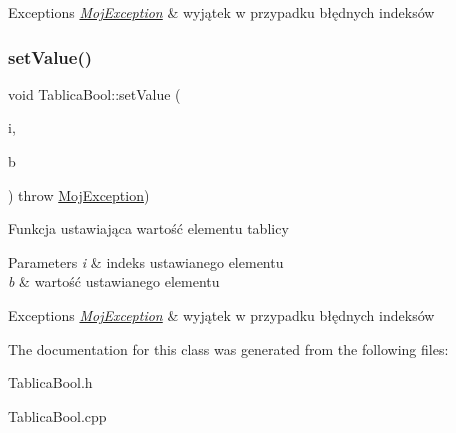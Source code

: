 \begin{DoxyExceptions}{Exceptions}
{\em \mbox{\hyperlink{class_moj_exception}{Moj\+Exception}}} & wyjątek w przypadku błędnych indeksów \\
\hline
\end{DoxyExceptions}
\mbox{\label{class_tablica_bool_a10ca9f3b3a983162934b4f3e277c7a74}} 
\subsubsection{\texorpdfstring{set\+Value()}{setValue()}}
{\footnotesize\ttfamily void Tablica\+Bool\+::set\+Value (\begin{DoxyParamCaption}\item[{long}]{i,  }\item[{bool}]{b }\end{DoxyParamCaption}) throw  \mbox{\hyperlink{class_moj_exception}{Moj\+Exception}}) }

Funkcja ustawiająca wartość elementu tablicy 
\begin{DoxyParams}{Parameters}
{\em i} & indeks ustawianego elementu \\
\hline
{\em b} & wartość ustawianego elementu \\
\hline
\end{DoxyParams}

\begin{DoxyExceptions}{Exceptions}
{\em \mbox{\hyperlink{class_moj_exception}{Moj\+Exception}}} & wyjątek w przypadku błędnych indeksów \\
\hline
\end{DoxyExceptions}


The documentation for this class was generated from the following files\+:\begin{DoxyCompactItemize}
\item 
Tablica\+Bool.\+h\item 
Tablica\+Bool.\+cpp\end{DoxyCompactItemize}
